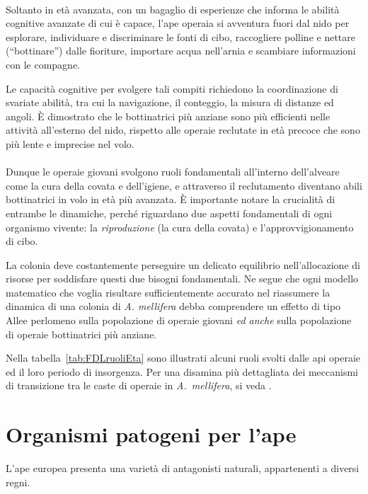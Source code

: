 \paragraph{}
Soltanto in età avanzata, con un bagaglio di esperienze che informa le abilità cognitive avanzate di cui è capace, l'ape operaia si avventura fuori dal nido per esplorare, individuare e discriminare le fonti di cibo, raccogliere polline e nettare (``bottinare'') dalle fioriture, importare acqua nell'arnia e scambiare informazioni con le compagne.

Le capacità cognitive per svolgere tali compiti richiedono la coordinazione di svariate abilità, tra cui la navigazione, il conteggio, la misura di distanze ed angoli.
È dimostrato che le bottinatrici più anziane sono più efficienti nelle attività all'esterno del nido, rispetto alle operaie reclutate in età precoce che sono più lente e imprecise nel volo.

\paragraph{}
Dunque le operaie giovani svolgono ruoli fondamentali all'interno dell'alveare come la cura della covata e dell'igiene, e attraverso il reclutamento diventano abili bottinatrici in volo in età più avanzata.
È importante notare la crucialità di entrambe le dinamiche, perché riguardano due aspetti fondamentali di ogni organismo vivente: la \emph{riproduzione} (la cura della covata) e l'approvvigionamento di cibo.

La colonia deve costantemente perseguire un delicato equilibrio nell'allocazione di risorse per soddisfare questi due bisogni fondamentali.
Ne segue che ogni modello matematico che voglia risultare sufficientemente accurato nel riassumere la dinamica di una colonia di \emph{A. mellifera} debba comprendere un effetto di tipo Allee perlomeno sulla popolazione di operaie giovani
\emph{ed anche} sulla popolazione di operaie bottinatrici più anziane.

Nella tabella~\ref{tab:FDLruoliEta} sono illustrati alcuni ruoli svolti dalle api operaie ed il loro periodo di insorgenza.
Per una disamina più dettagliata dei meccanismi di transizione tra le caste di operaie in \emph{A.~mellifera},
si veda \cite{meccanica}.




\section{Organismi patogeni per l'ape}
L'ape europea presenta una varietà di antagonisti naturali, appartenenti a diversi regni.

